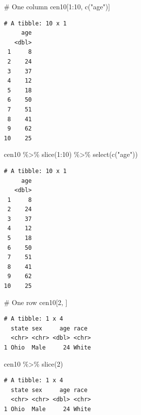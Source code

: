 \documentclass[
  letterpaper,
]{book}
\newenvironment{Shaded}{\begin{snugshade}}{\end{snugshade}}
\newcommand{\CommentTok}[1]{\textcolor[rgb]{0.37,0.37,0.37}{#1}}
\newcommand{\DecValTok}[1]{\textcolor[rgb]{0.68,0.00,0.00}{#1}}
\newcommand{\FunctionTok}[1]{\textcolor[rgb]{0.28,0.35,0.67}{#1}}
\newcommand{\NormalTok}[1]{\textcolor[rgb]{0.00,0.23,0.31}{#1}}
\newcommand{\SpecialCharTok}[1]{\textcolor[rgb]{0.37,0.37,0.37}{#1}}
\newcommand{\StringTok}[1]{\textcolor[rgb]{0.13,0.47,0.30}{#1}}
\theoremstyle{definition}
\theoremstyle{definition}
\theoremstyle{plain}
\theoremstyle{definition}
\theoremstyle{plain}
\theoremstyle{plain}
\theoremstyle{remark}
\begin{document}
\begin{Shaded}
\begin{Highlighting}[]
\CommentTok{\# One column}
\NormalTok{cen10[}\DecValTok{1}\SpecialCharTok{:}\DecValTok{10}\NormalTok{, }\FunctionTok{c}\NormalTok{(}\StringTok{"age"}\NormalTok{)]}
\end{Highlighting}
\end{Shaded}

\begin{verbatim}
# A tibble: 10 x 1
     age
   <dbl>
 1     8
 2    24
 3    37
 4    12
 5    18
 6    50
 7    51
 8    41
 9    62
10    25
\end{verbatim}

\begin{Shaded}
\begin{Highlighting}[]
\NormalTok{cen10 }\SpecialCharTok{\%\textgreater{}\%} \FunctionTok{slice}\NormalTok{(}\DecValTok{1}\SpecialCharTok{:}\DecValTok{10}\NormalTok{) }\SpecialCharTok{\%\textgreater{}\%} \FunctionTok{select}\NormalTok{(}\FunctionTok{c}\NormalTok{(}\StringTok{"age"}\NormalTok{))}
\end{Highlighting}
\end{Shaded}

\begin{verbatim}
# A tibble: 10 x 1
     age
   <dbl>
 1     8
 2    24
 3    37
 4    12
 5    18
 6    50
 7    51
 8    41
 9    62
10    25
\end{verbatim}

\begin{Shaded}
\begin{Highlighting}[]
\CommentTok{\# One row}
\NormalTok{cen10[}\DecValTok{2}\NormalTok{, ]}
\end{Highlighting}
\end{Shaded}

\begin{verbatim}
# A tibble: 1 x 4
  state sex     age race 
  <chr> <chr> <dbl> <chr>
1 Ohio  Male     24 White
\end{verbatim}

\begin{Shaded}
\begin{Highlighting}[]
\NormalTok{cen10 }\SpecialCharTok{\%\textgreater{}\%} \FunctionTok{slice}\NormalTok{(}\DecValTok{2}\NormalTok{)}
\end{Highlighting}
\end{Shaded}

\begin{verbatim}
# A tibble: 1 x 4
  state sex     age race 
  <chr> <chr> <dbl> <chr>
1 Ohio  Male     24 White
\end{verbatim}
\end{document}
